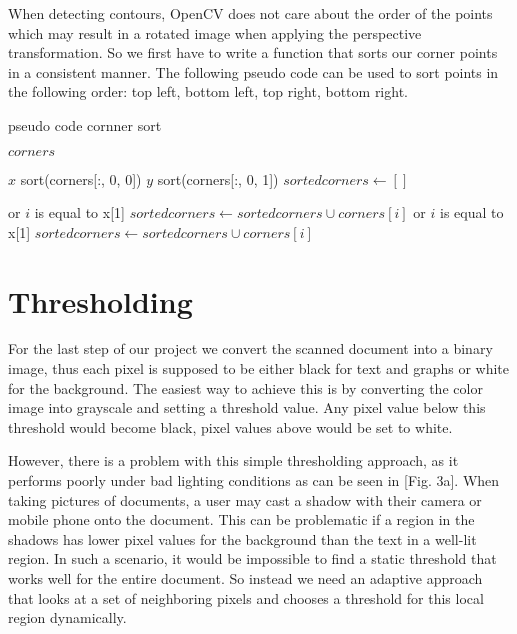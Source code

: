\documentclass[bibliography=totoc]{scrartcl}
\begin{document}
	When detecting contours, OpenCV does not care about the order of the points which may result in a rotated image when applying the perspective transformation.
	So we first have to write a function that sorts our corner points in a consistent manner.
	The following pseudo code can be used to sort points in the following order: top left, bottom left, top right, bottom right.


\begin{algorithm}[hbt!]
\caption{pseudo code cornner sort}\label{alg:cap}
\begin{algorithmic}
\Require $corners$

\State $x$ \gets sort(corners[:, 0, 0]) 
\State $y$ \gets sort(corners[:, 0, 1]) 
\State $sortedcorners \gets []$

 or $i$ is equal to x[1]
    \State $sortedcorners \gets sortedcorners \cup corners[i]$
\EndIf
\EndWhile
{}
 or $i$ is equal to x[1]
    \State $sortedcorners \gets sortedcorners \cup corners[i]$
    
\EndIf
\EndWhile
\end{algorithmic}
\end{algorithm}
	

	
	\section{Thresholding}
	For the last step of our project we convert the scanned document into a binary image, thus each pixel is supposed to be either black for text and graphs or white for the background.
	The easiest way to achieve this is by converting the color image into grayscale and setting a threshold value. 
	Any pixel value below this threshold would become black, pixel values above would be set to white.

	However, there is a problem with this simple thresholding approach, as it performs poorly under bad lighting conditions as can be seen in [Fig. 3a].
	When taking pictures of documents, a user may cast a shadow with their camera or mobile phone onto the document. 
	This can be problematic if a region in the shadows has lower pixel values for the background than the text in a well-lit region.
	In such a scenario, it would be impossible to find a static threshold that works well for the entire document.
	So instead we need an adaptive approach that looks at a set of neighboring pixels and chooses a threshold for this local region dynamically.
\end{document}
